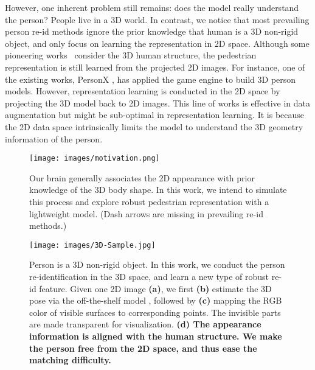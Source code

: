 However, one inherent problem still remains: does the model really understand the person? People live in a 3D world. In contrast, we notice that most prevailing person re-id methods ignore the prior knowledge that human is a 3D non-rigid object, and only focus on learning the representation in 2D space. Although some pioneering works~\cite{barbosa2018looking,sun2019dissecting} consider the 3D human structure, the pedestrian representation is still learned from the projected 2D images. For instance, one of the existing works, PersonX \cite{sun2019dissecting}, has applied the game engine to build 3D person models. However, representation learning is conducted in the 2D space by projecting the 3D model back to 2D images. This line of works is effective in data augmentation but might be sub-optimal in representation learning. It is because the 2D data space intrinsically limits the model to understand the 3D geometry information of the person.

\begin{figure}[t]
\begin{center}
     \texttt{[image: images/motivation.png]}
\end{center} \caption{ Our brain generally associates the 2D appearance with prior knowledge of the 3D body shape. In this work, we intend to simulate this process and explore robust pedestrian representation with a lightweight model. (Dash arrows are missing in prevailing re-id methods.)
      }
      \label{fig:motivation}
\end{figure}

\begin{figure*}[t]
\begin{center}
     \texttt{[image: images/3D-Sample.jpg]}
\end{center} \caption{ Person is a 3D non-rigid object. In this work, we conduct the person re-identification in the 3D space, and learn a new type of robust re-id feature. Given one 2D image \textbf{(a)}, we first \textbf{(b)} estimate the 3D pose via the off-the-shelf model \cite{kanazawaHMR18}, followed by \textbf{(c)} mapping the RGB color of visible surfaces to corresponding points. The invisible parts are made transparent for visualization. \textbf{(d) The appearance information is aligned with the human structure. We make the person free from the 2D space, and thus ease the matching difficulty.} }
      \label{fig:data}
\end{figure*}

